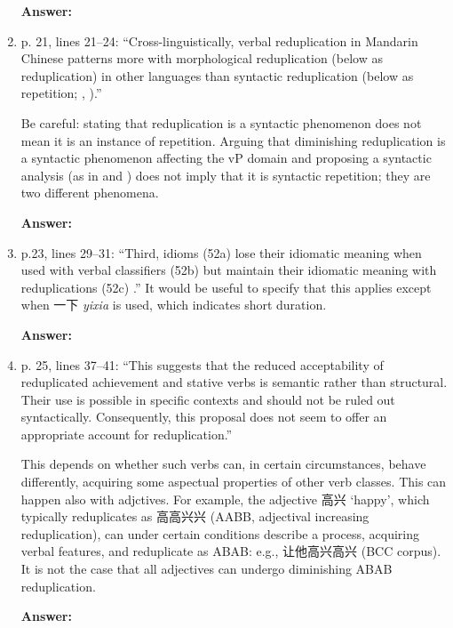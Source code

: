 \documentclass[fleqn,twoside]{article}
\begin{document}
\begin{enumerate}
\noindent
\textbf{Answer:}

\item p. 21, lines 21--24: ``Cross-linguistically, verbal reduplication in Mandarin Chinese patterns more with
morphological reduplication (below as reduplication) in other languages than syntactic reduplication
(below as repetition; \citealt[31]{Gil2005}, \citealt[1--2]{Forza2016}).''

Be careful: stating that reduplication is a syntactic phenomenon does not mean it is an instance of
repetition. Arguing that diminishing reduplication is a syntactic phenomenon affecting the vP domain
and proposing a syntactic analysis (as in \citealt{Arcodiaetal2014} and \citealt{BascianoMelloni2017}) does not imply that it is syntactic repetition; they are two different phenomena.

\noindent
\textbf{Answer:}

\item p.23, lines 29--31: ``Third, idioms (52a) lose their idiomatic meaning when used with verbal classifiers
(52b) but maintain their idiomatic meaning with reduplications (52c) \citep[230--231]{YangWei2017}.''
It would be useful to specify that this applies except when 一下 \textit{yixia} is used, which indicates short
duration.

\noindent
\textbf{Answer:}

\item p. 25, lines 37--41: ``This suggests that the reduced acceptability of reduplicated achievement and
stative verbs is semantic rather than structural. Their use is possible in specific contexts and should
not be ruled out syntactically. Consequently, this proposal does not seem to offer an appropriate
account for reduplication.''

This depends on whether such verbs can, in certain circumstances, behave differently, acquiring some
aspectual properties of other verb classes. This can happen also with adjctives. For example, the
adjective 高兴 `happy', which typically reduplicates as 高高兴兴 (AABB, adjectival increasing
reduplication), can under certain conditions describe a process, acquiring verbal features, and
reduplicate as ABAB: e.g., 让他高兴高兴 (BCC corpus). It is not the case that all adjectives can
undergo diminishing ABAB reduplication.

\noindent
\textbf{Answer:}


\end{enumerate}
\end{document}

